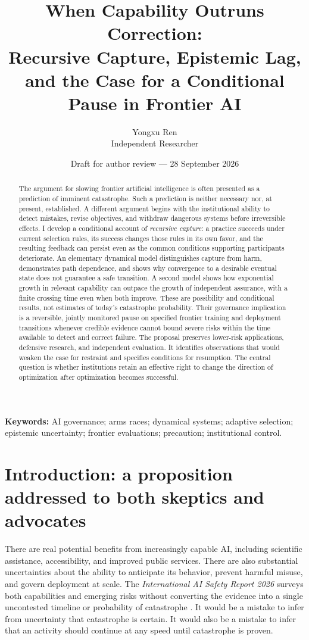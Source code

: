 \documentclass[11pt]{article}
\title{When Capability Outruns Correction:\\Recursive Capture, Epistemic Lag, and the Case for a Conditional Pause in Frontier AI}
\author{Yongxu Ren\\Independent Researcher}
\date{Draft for author review --- 28 September 2026}
\begin{document}
\maketitle
\begin{abstract}
The argument for slowing frontier artificial intelligence is often presented as a prediction of imminent catastrophe. Such a prediction is neither necessary nor, at present, established. A different argument begins with the institutional ability to detect mistakes, revise objectives, and withdraw dangerous systems before irreversible effects. I develop a conditional account of \emph{recursive capture}: a practice succeeds under current selection rules, its success changes those rules in its own favor, and the resulting feedback can persist even as the common conditions supporting participants deteriorate. An elementary dynamical model distinguishes capture from harm, demonstrates path dependence, and shows why convergence to a desirable eventual state does not guarantee a safe transition. A second model shows how exponential growth in relevant capability can outpace the growth of independent assurance, with a finite crossing time even when both improve. These are possibility and conditional results, not estimates of today's catastrophe probability. Their governance implication is a reversible, jointly monitored pause on specified frontier training and deployment transitions whenever credible evidence cannot bound severe risks within the time available to detect and correct failure. The proposal preserves lower-risk applications, defensive research, and independent evaluation. It identifies observations that would weaken the case for restraint and specifies conditions for resumption. The central question is whether institutions retain an effective right to change the direction of optimization after optimization becomes successful.
\end{abstract}

\noindent\textbf{Keywords:} AI governance; arms races; dynamical systems; adaptive selection; epistemic uncertainty; frontier evaluations; precaution; institutional control.

\section{Introduction: a proposition addressed to both skeptics and advocates}

There are real potential benefits from increasingly capable AI, including scientific assistance, accessibility, and improved public services. There are also substantial uncertainties about the ability to anticipate its behavior, prevent harmful misuse, and govern deployment at scale. The \emph{International AI Safety Report 2026} surveys both capabilities and emerging risks without converting the evidence into a single uncontested timeline or probability of catastrophe \cite{iasr2026}. It would be a mistake to infer from uncertainty that catastrophe is certain. It would also be a mistake to infer that an activity should continue at any speed until catastrophe is proven.
\end{document}
